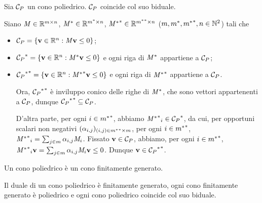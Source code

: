 \begin{Theorem}
	Sia $\mathcal{C}_P$ un cono poliedrico. $\mathcal{C}_P$ coincide col suo biduale.
\end{Theorem}
\Proof Siano $\mathit{M} \in \mathbb{R}^{m \times n}$, ${{\mathit{M}}^*} \in \mathbb{R}^{{{m}^*} \times n}$, ${{{{\mathit{M}}^*}}^*} \in \mathbb{R}^{{{{{m}^*}}^*} \times n}$ ($m, {{m}^*}, {{{{m}^*}}^*}, n \in \mathbb{N}^2$) tali che
\begin{itemize}
	\item $\mathcal{C}_P = \lbrace \mathbf{v} \in \mathbb{R}^n: \mathit{M} \mathbf{v} \leq 0 \rbrace$;
	\item ${{\mathcal{C}_P}^*} = \lbrace \mathbf{v} \in \mathbb{R}^n: {{\mathit{M}}^*} \mathbf{v} \leq 0 \rbrace$ e ogni riga di ${{\mathit{M}}^*}$ appartiene a $\mathcal{C}_P$;
	\item ${{{{\mathcal{C}_P}^*}}^*} = \lbrace \mathbf{v} \in \mathbb{R}^n: {{{{\mathit{M}}^*}}^*} \mathbf{v} \leq 0 \rbrace$ e ogni riga di ${{{{\mathit{M}}^*}}^*}$ appartiene a $\mathcal{C}_P$.
\par Ora, ${{{{\mathcal{C}_P}^*}}^*}$ \`e inviluppo conico delle righe di ${{\mathit{M}}^*}$, che sono vettori appartenenti a $\mathcal{C}_P$, dunque ${{{{\mathcal{C}_P}^*}}^*} \subseteq \mathcal{C}_P$.
\par D'altra parte, per ogni $i \in {{{{m}^*}}^*}$, abbiamo ${{{{\mathit{M}}^*}}^*}_i \in {{\mathcal{C}_P}^*}$, da cui, per opportuni scalari non negativi $(\alpha_{i,j})_{(i,j) \in {{{{m}^*}}^*} \times m}$, per ogni $i \in {{{{m}^*}}^*}$, ${{{{\mathit{M}}^*}}^*}_i = \sum_{j \in m} \alpha_{i,j} \mathit{M}_i$. Fissato $\mathbf{v} \in \mathcal{C}_P$, abbiamo, per ogni $i \in {{{{m}^*}}^*}$, ${{{{\mathit{M}}^*}}^*}_i \mathbf{v} = \sum_{j \in m} \alpha_{i,j} \mathit{M}_i \mathbf{v} \leq 0$. Dunque $\mathbf{v} \in {{{{\mathcal{C}_P}^*}}^*}$. \EndProof
\end{itemize}
\begin{Corollary}
	Un cono poliedrico \`e un cono finitamente generato.
\end{Corollary}
\Proof Il duale di un cono poliedrico \`e finitamente generato, ogni cono finitamente generato \`e poliedrico e ogni cono poliedrico coincide col suo biduale. \EndProof

